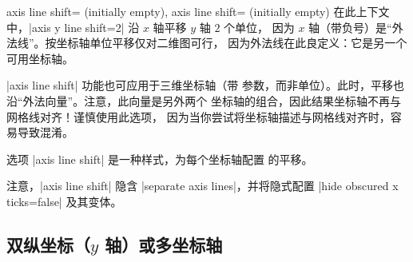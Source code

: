 \begin{pgfplotsxykeylist}{
    axis \x\space line shift= (initially empty), axis
    line shift= (initially empty)}
    在此上下文中，|axis y line shift=2| 沿 $x$ 轴平移 $y$ 轴 $2$ 个单位，
    因为 $x$ 轴（带负号）是``外法线''。按坐标轴单位平移仅对二维图可行，
    因为外法线在此良定义：它是另一个可用坐标轴。

    |axis line shift| 功能也可应用于三维坐标轴（带 
    参数，而非单位）。此时，平移也沿``外法向量''。注意，此向量是另外两个
    坐标轴的组合，因此结果坐标轴不再与网格线对齐！谨慎使用此选项，
    因为当你尝试将坐标轴描述与网格线对齐时，容易导致混淆。
\begin{codeexample}[]
\end{codeexample}

    选项 |axis line shift| 是一种样式，为每个坐标轴配置 
    的平移。

    注意，|axis line shift| 隐含 |separate axis lines|，并将隐式配置
    |hide obscured x ticks=false| 及其变体。
\end{pgfplotsxykeylist}


\subsection{双纵坐标（$y$ 轴）或多坐标轴}

